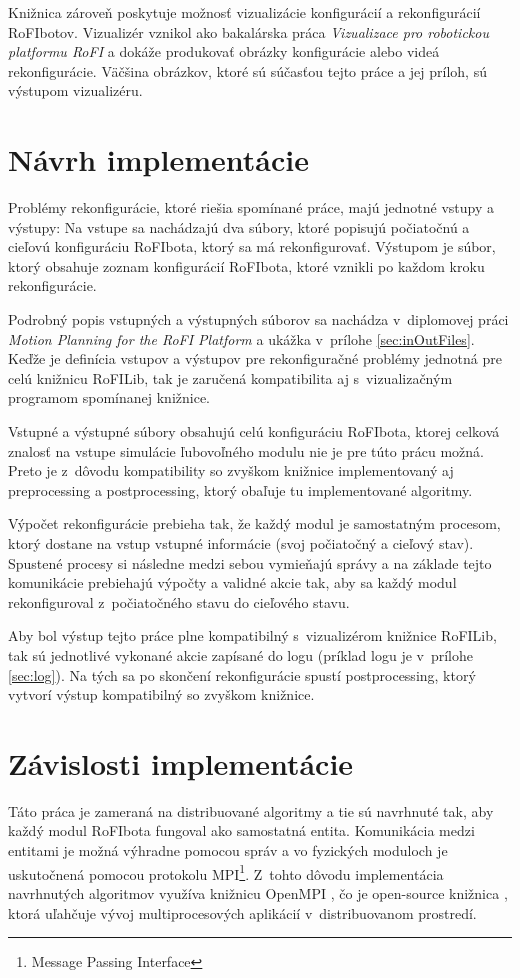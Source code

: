 \documentclass[
  printed, %
  oneside, %
  notable,   %
  nolof,     %
  nolot,     %
]{fithesis3}
\begin{document}
Knižnica zároveň poskytuje možnosť vizualizácie konfigurácií a rekonfigurácií RoFIbotov. Vizualizér vznikol ako bakalárska práca \textit{Vizualizace pro robotickou platformu RoFI} \cite{nausovaBachelorThesis} a dokáže produkovať obrázky konfigurácie alebo videá rekonfigurácie. Väčšina obrázkov, ktoré sú súčasťou tejto práce a jej príloh, sú výstupom vizualizéru. 

\section{Návrh implementácie}
Problémy rekonfigurácie, ktoré riešia spomínané práce, majú jednotné vstupy a výstupy: Na vstupe sa nachádzajú dva súbory, ktoré popisujú počiatočnú a cieľovú konfiguráciu RoFIbota, ktorý sa má rekonfigurovať. Výstupom je súbor, ktorý obsahuje zoznam konfigurácií RoFIbota, ktoré vznikli po každom kroku rekonfigurácie. 

Podrobný popis vstupných a výstupných súborov sa nachádza v~diplomovej práci \textit{Motion Planning for the RoFI Platform} \cite{vozarovaMasterThesis} a ukážka v~prílohe \ref{sec:inOutFiles}. Keďže je definícia vstupov a výstupov pre rekonfiguračné problémy jednotná pre celú knižnicu RoFILib, tak je zaručená kompatibilita aj s~vizualizačným programom spomínanej knižnice. 

Vstupné a výstupné súbory obsahujú celú konfiguráciu RoFIbota, ktorej celková znalosť na vstupe simulácie ľubovoľného modulu nie je pre túto prácu možná. Preto je z~dôvodu kompatibility so zvyškom knižnice implementovaný aj preprocessing a postprocessing, ktorý obaľuje tu implementované algoritmy. 

Výpočet rekonfigurácie prebieha tak, že každý modul je samostatným procesom, ktorý dostane na vstup vstupné informácie (svoj počiatočný a cieľový stav). Spustené procesy si následne medzi sebou vymieňajú správy a na základe tejto komunikácie prebiehajú výpočty a validné akcie tak, aby sa každý modul rekonfiguroval z~počiatočného stavu do cieľového stavu. 

Aby bol výstup tejto práce plne kompatibilný s~vizualizérom knižnice RoFILib, tak sú jednotlivé vykonané akcie zapísané do logu (príklad logu je v~prílohe \ref{sec:log}). Na tých sa po skončení rekonfigurácie spustí postprocessing, ktorý vytvorí výstup kompatibilný so zvyškom knižnice. 

\section{Závislosti implementácie}
\label{sec:libraries}
Táto práca je zameraná na distribuované algoritmy a tie sú navrhnuté tak, aby každý modul RoFIbota fungoval ako samostatná entita. Komunikácia medzi entitami je možná výhradne pomocou správ a vo fyzických moduloch je uskutočnená pomocou protokolu MPI\footnote{Message Passing Interface}. Z~tohto dôvodu implementácia navrhnutých algoritmov využíva knižnicu OpenMPI \cite{openMPILibrary}, čo je open-source knižnica \cite{openMPIGit}, ktorá uľahčuje vývoj multiprocesových aplikácií v~distribuovanom prostredí. 
\end{document}
